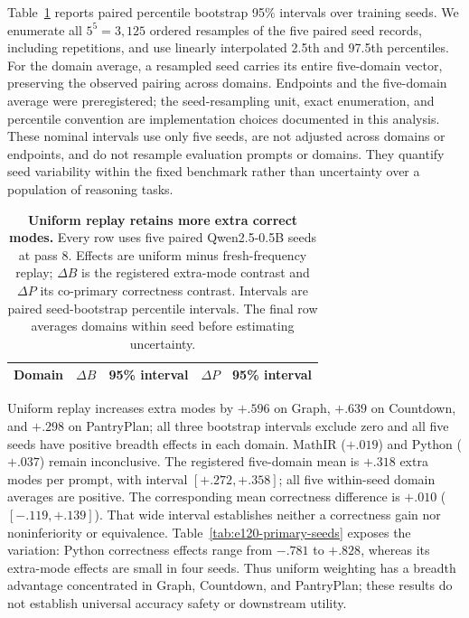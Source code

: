 \documentclass{article}
\newcommand{\1}{\mathbf 1}
\theoremstyle{remark}
\theoremstyle{definition}
\theoremstyle{plain}
\begin{document}
Table~\ref{tab:e120-primary-breadth} reports paired percentile bootstrap
95\% intervals over training seeds. We enumerate all $5^5=3{,}125$ ordered
resamples of the five paired seed records, including repetitions, and use
linearly interpolated 2.5th and 97.5th percentiles. For the domain average,
a resampled seed carries its entire five-domain vector, preserving the
observed pairing across domains. Endpoints and the five-domain average were
preregistered; the seed-resampling unit, exact enumeration, and percentile
convention are implementation choices documented in this analysis. These
nominal intervals use only five seeds, are not adjusted across domains or
endpoints, and do not resample evaluation prompts or domains. They quantify
seed variability within the fixed benchmark rather than uncertainty over a
population of reasoning tasks.

\begin{table}[H]
  \centering
  \caption{\textbf{Uniform replay retains more extra correct modes.}
  Every row uses five paired Qwen2.5-0.5B seeds at pass 8. Effects are
  uniform minus fresh-frequency replay; $\Delta B$ is the registered
  extra-mode contrast and $\Delta P$ its co-primary correctness contrast.
  Intervals are paired seed-bootstrap percentile intervals. The final row
  averages domains within seed before estimating uncertainty.}
  \label{tab:e120-primary-breadth}
  \small
  \setlength{\tabcolsep}{4pt}
  \begin{tabular}{@{}lrrrr@{}}
    \toprule
    \textbf{Domain} & $\Delta B$ & \textbf{95\% interval}
      & $\Delta P$ & \textbf{95\% interval} \\
    \midrule
    
  \end{tabular}
\end{table}

Uniform replay increases extra modes by $+.596$ on Graph, $+.639$ on
Countdown, and $+.298$ on PantryPlan; all three bootstrap intervals exclude
zero and all five seeds have positive breadth effects in each domain.
MathIR ($+.019$) and Python ($+.037$) remain inconclusive. The registered
five-domain mean is $+.318$ extra modes per prompt, with interval
$[+.272,+.358]$; all five within-seed domain averages are positive.
The corresponding mean correctness difference is $+.010$
($[-.119,+.139]$). That wide interval establishes neither a correctness gain
nor noninferiority or equivalence. Table~\ref{tab:e120-primary-seeds} exposes
the variation: Python correctness effects range from $-.781$ to $+.828$,
whereas its extra-mode effects are small in four seeds. Thus uniform weighting
has a breadth advantage concentrated in Graph, Countdown, and PantryPlan;
these results do not establish universal accuracy safety or downstream utility.
\end{document}
